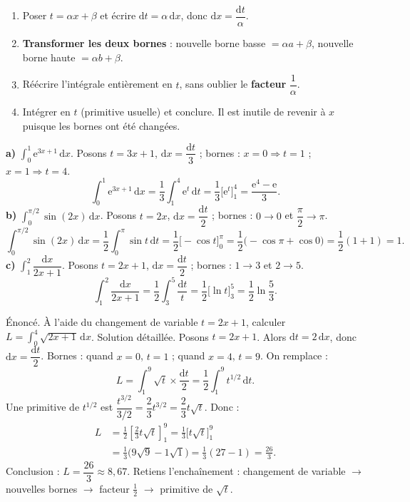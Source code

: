 \documentclass[11pt]{article}
\begin{document}
\begin{methode}
\begin{enumerate}
\item Poser $t = \alpha x + \beta$ et écrire $\mathrm{d}t = \alpha\,\mathrm{d}x$, donc $\mathrm{d}x = \dfrac{\mathrm{d}t}{\alpha}$.
\item \textbf{Transformer les deux bornes} : nouvelle borne basse $= \alpha a + \beta$, nouvelle borne haute $= \alpha b + \beta$.
\item Réécrire l'intégrale entièrement en $t$, sans oublier le \textbf{facteur} $\dfrac{1}{\alpha}$.
\item Intégrer en $t$ (primitive usuelle) et conclure. Il est inutile de revenir à $x$ puisque les bornes ont été changées.
\end{enumerate}
\end{methode}

\begin{exemplebox}
\textbf{a)} $\displaystyle\int_0^1 \mathrm{e}^{3x+1}\,\mathrm{d}x$. Posons $t = 3x+1$, $\mathrm{d}x = \dfrac{\mathrm{d}t}{3}$ ; bornes : $x=0 \Rightarrow t=1$ ; $x=1 \Rightarrow t=4$.
\[ \int_0^1 \mathrm{e}^{3x+1}\,\mathrm{d}x = \frac{1}{3}\int_1^4 \mathrm{e}^t\,\mathrm{d}t = \frac{1}{3}\big[\mathrm{e}^t\big]_1^4 = \frac{\mathrm{e}^4 - \mathrm{e}}{3}. \]
\textbf{b)} $\displaystyle\int_0^{\pi/2} \sin(2x)\,\mathrm{d}x$. Posons $t = 2x$, $\mathrm{d}x = \dfrac{\mathrm{d}t}{2}$ ; bornes : $0 \to 0$ et $\dfrac{\pi}{2} \to \pi$.
\[ \int_0^{\pi/2} \sin(2x)\,\mathrm{d}x = \frac{1}{2}\int_0^{\pi} \sin t\,\mathrm{d}t = \frac{1}{2}\big[-\cos t\big]_0^{\pi} = \frac{1}{2}\big(-\cos\pi + \cos 0\big) = \frac{1}{2}(1 + 1) = 1. \]
\textbf{c)} $\displaystyle\int_1^2 \dfrac{\mathrm{d}x}{2x+1}$. Posons $t = 2x+1$, $\mathrm{d}x = \dfrac{\mathrm{d}t}{2}$ ; bornes : $1 \to 3$ et $2 \to 5$.
\[ \int_1^2 \frac{\mathrm{d}x}{2x+1} = \frac{1}{2}\int_3^5 \frac{\mathrm{d}t}{t} = \frac{1}{2}\big[\ln t\big]_3^5 = \frac{1}{2}\ln\frac{5}{3}. \]
\end{exemplebox}

\begin{exoresolu}
Énoncé. À l'aide du changement de variable $t = 2x+1$, calculer $L = \displaystyle\int_0^4 \sqrt{2x+1}\,\mathrm{d}x$.
\tcblower
Solution détaillée. Posons $t = 2x + 1$. Alors $\mathrm{d}t = 2\,\mathrm{d}x$, donc $\mathrm{d}x = \dfrac{\mathrm{d}t}{2}$.
Bornes : quand $x = 0$, $t = 1$ ; quand $x = 4$, $t = 9$. On remplace :
\[ L = \int_1^9 \sqrt{t}\times\frac{\mathrm{d}t}{2} = \frac{1}{2}\int_1^9 t^{1/2}\,\mathrm{d}t. \]
Une primitive de $t^{1/2}$ est $\dfrac{t^{3/2}}{3/2} = \dfrac{2}{3}t^{3/2} = \dfrac{2}{3}t\sqrt{t}$. Donc :
\begin{align*}
L &= \frac{1}{2}\left[\frac{2}{3}t\sqrt{t}\right]_1^9 = \frac{1}{3}\big[t\sqrt{t}\big]_1^9 \\
&= \frac{1}{3}\big(9\sqrt{9} - 1\sqrt{1}\big) = \frac{1}{3}(27 - 1) = \frac{26}{3}.
\end{align*}
Conclusion : $L = \dfrac{26}{3} \approx 8{,}67$. Retiens l'enchaînement : changement de variable $\to$ nouvelles bornes $\to$ facteur $\tfrac12$ $\to$ primitive de $\sqrt{t}$.
\end{exoresolu}
\end{document}
